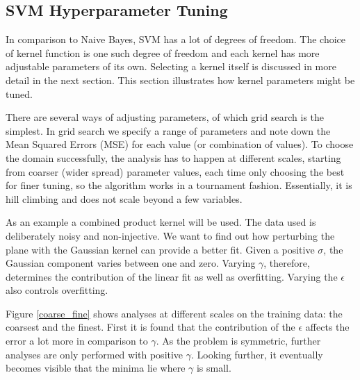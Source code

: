\documentclass[12pt,notitlepage,twoside]{scrbook}
\begin{document}
\subsection{SVM Hyperparameter Tuning}
\label{sec:tuning}
In comparison to Naive Bayes, SVM has a lot of degrees of freedom. The choice of kernel function is
one such degree of freedom and each kernel has more adjustable parameters of its own. Selecting a kernel 
itself is discussed in more detail in the next section. This section illustrates how
kernel parameters might be tuned. 

There are several ways of adjusting parameters, of which grid search is the simplest. In
grid search we specify a range of parameters and note down the Mean Squared Errors (MSE) for each value (or
combination of values). To choose the domain successfully, the analysis has to happen at
different scales, starting from coarser (wider spread) parameter values, each time only
choosing the best for finer tuning, so the algorithm works in a tournament fashion.
Essentially, it is hill climbing and does not scale beyond a few variables.

As an example a combined product kernel will be used. The data used is deliberately noisy
and non-injective. We want to find out how perturbing the plane with the Gaussian kernel can provide a better fit. 
Given a positive $\sigma$, the Gaussian component varies between one and zero.
Varying $\gamma$, therefore, determines the contribution of the linear fit as well as overfitting.
Varying the $\epsilon$ also controls overfitting.

Figure \ref{coarse_fine} shows analyses at different scales on the training data: the coarsest and the finest.
First it is found that the
contribution of the $\epsilon$ affects the error a lot more in comparison to $\gamma$. As the
problem is symmetric, further analyses are only performed with positive $\gamma$. Looking
further, it eventually becomes visible that the minima lie where $\gamma$ is small. 
\end{document}
